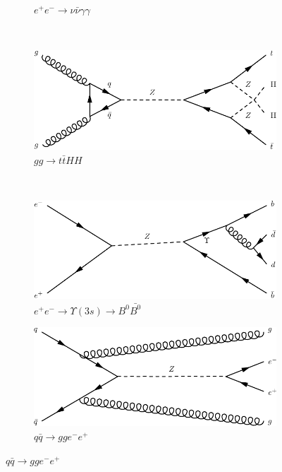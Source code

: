 \begin{figure}[h]
\begin{subfigure}[b]{0.3\textwidth}
    \caption{$e^+e^- \rightarrow \nu\bar{\nu}\gamma\gamma$}
    \label{fey:13}
  \end{subfigure}%
  ~
  \begin{subfigure}[b]{0.3\textwidth}
    \includegraphics[width=\textwidth]{../dia/14.pdf}
    \caption{$gg\rightarrow t\bar{t}HH$}
    \label{fey:14}
  \end{subfigure}%
  ~
  \begin{subfigure}[b]{0.3\textwidth}
    \includegraphics[width=\textwidth]{../dia/15.pdf}
    \caption{$e^+e^-\rightarrow \Upsilon(3s)\rightarrow B^0\bar{B^0}$}
    \label{fey:15}
  \end{subfigure}
  \newline
  \newline
  \begin{subfigure}[b]{0.3\textwidth}
    \includegraphics[width=\textwidth]{../dia/16.pdf}
    \caption{$q\bar{q}\rightarrow gge^-e^+$}
    \label{fey:16}

\end{subfigure}
\end{figure}
